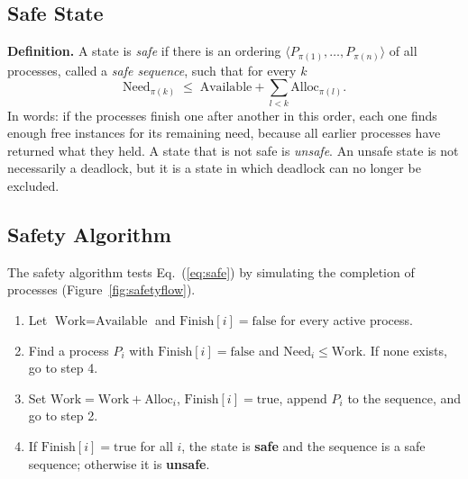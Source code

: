 \documentclass[11pt,a4paper]{report}
\begin{document}
\subsection{Safe State}
\textbf{Definition.} A state is \emph{safe} if there is an ordering $\langle P_{\pi(1)},\dots,P_{\pi(n)}\rangle$ of all processes, called a \emph{safe sequence}, such that for every $k$
\begin{equation}
\text{Need}_{\pi(k)} \;\le\; \text{Available} + \sum_{l<k} \text{Alloc}_{\pi(l)}. \label{eq:safe}
\end{equation}
In words: if the processes finish one after another in this order, each one finds enough free instances for its remaining need, because all earlier processes have returned what they held. A state that is not safe is \emph{unsafe}. An unsafe state is not necessarily a deadlock, but it is a state in which deadlock can no longer be excluded.

\subsection{Safety Algorithm}
The safety algorithm tests Eq.~(\ref{eq:safe}) by simulating the completion of processes (Figure~\ref{fig:safetyflow}).

\begin{enumerate}
    \item Let $\text{Work} = \text{Available}$ and $\text{Finish}[i]=\text{false}$ for every active process.
    \item Find a process $P_i$ with $\text{Finish}[i]=\text{false}$ and $\text{Need}_i \le \text{Work}$. If none exists, go to step 4.
    \item Set $\text{Work} = \text{Work} + \text{Alloc}_i$, $\text{Finish}[i]=\text{true}$, append $P_i$ to the sequence, and go to step 2.
    \item If $\text{Finish}[i]=\text{true}$ for all $i$, the state is \textbf{safe} and the sequence is a safe sequence; otherwise it is \textbf{unsafe}.
\end{enumerate}
\end{document}
